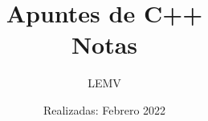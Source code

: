 \documentclass{article}
\title{Apuntes de C++\\
\Large{Notas}}
\author{LEMV}
\date{Realizadas: Febrero 2022}
\begin{document}
\renewcommand*\contentsname{Índice}
\renewcommand{\listtablename}{Índice de Tablas}

\maketitle\newpage
\tableofcontents\newpage
\listoftables\newpage








\end{document}
